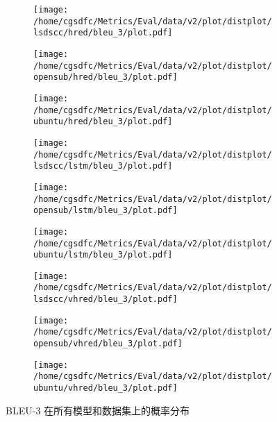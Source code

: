 \begin{figure}%
\centering%
\begin{subfigure}{0.3333333333333333\linewidth}%
\centering%
\texttt{[image: /home/cgsdfc/Metrics/Eval/data/v2/plot/distplot/lsdscc/hred/bleu\_3/plot.pdf]}%
\end{subfigure}%
\begin{subfigure}{0.3333333333333333\linewidth}%
\centering%
\texttt{[image: /home/cgsdfc/Metrics/Eval/data/v2/plot/distplot/opensub/hred/bleu\_3/plot.pdf]}%
\end{subfigure}%
\begin{subfigure}{0.3333333333333333\linewidth}%
\centering%
\texttt{[image: /home/cgsdfc/Metrics/Eval/data/v2/plot/distplot/ubuntu/hred/bleu\_3/plot.pdf]}%
\end{subfigure}%
\newline%
\begin{subfigure}{0.3333333333333333\linewidth}%
\centering%
\texttt{[image: /home/cgsdfc/Metrics/Eval/data/v2/plot/distplot/lsdscc/lstm/bleu\_3/plot.pdf]}%
\end{subfigure}%
\begin{subfigure}{0.3333333333333333\linewidth}%
\centering%
\texttt{[image: /home/cgsdfc/Metrics/Eval/data/v2/plot/distplot/opensub/lstm/bleu\_3/plot.pdf]}%
\end{subfigure}%
\begin{subfigure}{0.3333333333333333\linewidth}%
\centering%
\texttt{[image: /home/cgsdfc/Metrics/Eval/data/v2/plot/distplot/ubuntu/lstm/bleu\_3/plot.pdf]}%
\end{subfigure}%
\newline%
\begin{subfigure}{0.3333333333333333\linewidth}%
\centering%
\texttt{[image: /home/cgsdfc/Metrics/Eval/data/v2/plot/distplot/lsdscc/vhred/bleu\_3/plot.pdf]}%
\end{subfigure}%
\begin{subfigure}{0.3333333333333333\linewidth}%
\centering%
\texttt{[image: /home/cgsdfc/Metrics/Eval/data/v2/plot/distplot/opensub/vhred/bleu\_3/plot.pdf]}%
\end{subfigure}%
\begin{subfigure}{0.3333333333333333\linewidth}%
\centering%
\texttt{[image: /home/cgsdfc/Metrics/Eval/data/v2/plot/distplot/ubuntu/vhred/bleu\_3/plot.pdf]}%
\end{subfigure}%
\caption{BLEU{-}3 在所有模型和数据集上的概率分布}%
\label{fig:BLEU{-}3{-}dist{-}all}%
\end{figure}